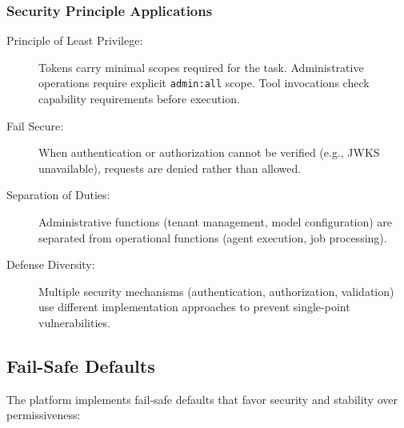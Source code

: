 \documentclass[a4paper,twoside]{sapthesis}
\begin{document}
\subsubsection{Security Principle Applications}

\begin{description}
    \item[Principle of Least Privilege:] Tokens carry minimal scopes required for the task. Administrative operations require explicit \texttt{admin:all} scope. Tool invocations check capability requirements before execution.
    
    \item[Fail Secure:] When authentication or authorization cannot be verified (e.g., JWKS unavailable), requests are denied rather than allowed.
    
    \item[Separation of Duties:] Administrative functions (tenant management, model configuration) are separated from operational functions (agent execution, job processing).
    
    \item[Defense Diversity:] Multiple security mechanisms (authentication, authorization, validation) use different implementation approaches to prevent single-point vulnerabilities.
\end{description}

\subsection{Fail-Safe Defaults}
\label{subsec:fail-safe}

The platform implements fail-safe defaults that favor security and stability over permissiveness:
\end{document}
